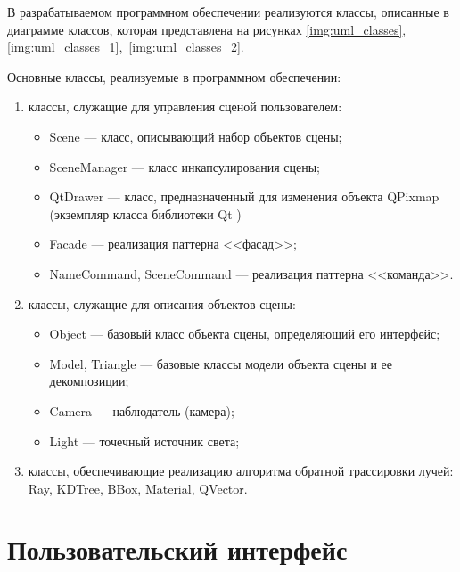 В разрабатываемом программном обеспечении реализуются классы, описанные в диаграмме классов, которая представлена на рисунках \ref{img:uml_classes}, \ref{img:uml_classes_1},~\ref{img:uml_classes_2}.




Основные классы, реализуемые в программном обеспечении:

\begin{enumerate}
	\item {
		классы, служащие для управления сценой пользователем:
		\begin{itemize}
			\item Scene --- класс, описывающий набор объектов сцены;
			\item SceneManager --- класс инкапсулирования сцены;
			\item QtDrawer --- класс, предназначенный для изменения объекта QPixmap (экземпляр класса библиотеки Qt \cite{qt})
			\item Facade --- реализация паттерна <<фасад>>;
			\item NameCommand, SceneCommand --- реализация паттерна <<команда>>.
		\end{itemize}
}
	\item {
		классы, служащие для описания объектов сцены:
		\begin{itemize}
			\item Object --- базовый класс объекта сцены, определяющий его интерфейс;
			\item Model, Triangle --- базовые классы модели объекта сцены и ее декомпозиции;
			\item Camera --- наблюдатель (камера);
			\item Light --- точечный источник света;
		\end{itemize}
}
	\item {
		классы, обеспечивающие реализацию алгоритма обратной трассировки лучей: Ray, KDTree, BBox, Material, QVector.
}
\end{enumerate}

\clearpage

\section{Пользовательский интерфейс}

